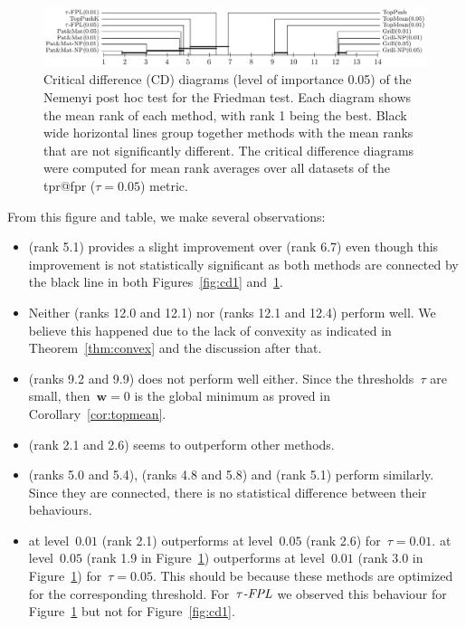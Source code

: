 \begin{figure}[!ht]
  \centering
  \includegraphics[width = \linewidth]{images/crit_diag_fpr_5.pdf}
  \caption{Critical difference (CD) diagrams (level of importance 0.05) of the Nemenyi post hoc test for the Friedman test. Each diagram shows the mean rank of each method, with rank 1 being the best. Black wide horizontal lines group together methods with the mean ranks that are not significantly different. The critical difference diagrams were computed for mean rank averages over all datasets of the tpr@fpr ($\tau=0.05$) metric.}
  \label{fig:cd2}
\end{figure}

From this figure and table, we make several observations:
\begin{itemize}
  \item \TopPushK (rank 5.1) provides a slight improvement over \TopPush (rank 6.7) even though this improvement is not statistically significant as both methods are connected by the black line in both Figures~\ref{fig:cd1} and~\ref{fig:cd2}.
  \item Neither \Grill (ranks 12.0 and 12.1) nor \GrillNP (ranks 12.1 and 12.4) perform well. We believe this happened due to the lack of convexity as indicated in Theorem~\ref{thm:convex} and the discussion after that.
  \item \TopMeanK (ranks 9.2 and 9.9) does not perform well either. Since the thresholds~$\tau$ are small, then~$\bm{w}=0$ is the global minimum as proved in Corollary~\ref{cor:topmean}.
  \item \PatMatNP (rank 2.1 and 2.6) seems to outperform other methods.
  \item \PatMat (ranks 5.0 and 5.4), \tauFPL (ranks 4.8 and 5.8) and \TopPushK (rank 5.1) perform similarly. Since they are connected, there is no statistical difference between their behaviours.
  \item \PatMatNP at level~$0.01$ (rank 2.1) outperforms \PatMatNP at level~$0.05$ (rank 2.6) for~$\tau=0.01$. \PatMatNP at level~$0.05$ (rank 1.9 in Figure~\ref{fig:cd2}) outperforms \PatMatNP at level~$0.01$ (rank 3.0 in Figure~\ref{fig:cd2}) for~$\tau=0.05$. This should be because these methods are optimized for the corresponding threshold. For~${\emph{$\tau$-FPL}}$ we observed this behaviour for Figure~\ref{fig:cd2} but not for Figure~\ref{fig:cd1}.
\end{itemize}

